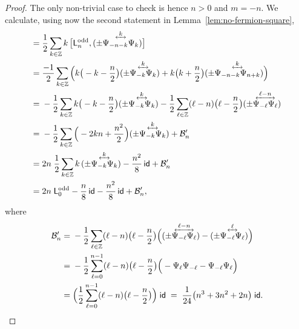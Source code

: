 \documentclass[12pt,oneside,english]{amsart}
\numberwithin{equation}{section}
\numberwithin{figure}{section}
\theoremstyle{plain}
\theoremstyle{plain}
\theoremstyle{plain}
\theoremstyle{plain}
\theoremstyle{remark}
\theoremstyle{definition}
\theoremstyle{plain}
\theoremstyle{plain}
\numberwithin{thm}{section}
\begin{document}
\begin{proof}
The only non-trivial case to check is hence $n>0$ and $m=-n$. We calculate, 
using now the second statement in Lemma~\ref{lem:no-fermion-square},
\begin{align*}
[\virL{n}^{\abbrOdd} , \virL{-n}^{\abbrOdd}]
= \; & \frac{1}{2} \sum_{k\in\Z} 
	k \, \big[ \virL{n}^{\abbrOdd} ,
		  \ourforder{\fermmode_{-n-k}}{\fermmode_{k}}{k} \big] \\
= \; & \frac{-1}{2} \sum_{k\in\Z} 
	\Big( k \big( -k-\frac{n}{2} \big)
	        \ourforder{\fermmode_{-k}}{\fermmode_{k}}{k}
	    + k \big( k+\frac{n}{2} \big)
	        \ourforder{\fermmode_{-n-k}}{\fermmode_{n+k}}{k}
	\Big) \\
= \; & -\frac{1}{2} \sum_{k\in\Z} 
	k \big( -k-\frac{n}{2} \big)
	        \ourforder{\fermmode_{-k}}{\fermmode_{k}}{k}
	- \frac{1}{2} \sum_{\ell\in\Z} 
	    (\ell - n) \big( \ell-\frac{n}{2} \big)
	        \ourforder{\fermmode_{-\ell}}{\fermmode_{\ell}}{\ell-n}  \\
= \; & -\frac{1}{2} \sum_{k\in\Z} 
	\Big( -2 k n + \frac{n^2}{2} \Big)
	        \ourforder{\fermmode_{-k}}{\fermmode_{k}}{k}
	+ \mathcal{B}'_{n} \\
= \; & 2n \; \frac{1}{2} \sum_{k\in\Z} 
		k \, \ourforder{\fermmode_{-k}}{\fermmode_{k}}{k}
	- \frac{n^2}{8} \, \id
	+ \mathcal{B}'_{n} \\
= \; & 2n \; \virL{0}^{\abbrOdd}
	- \frac{n}{8} \, \id
	- \frac{n^2}{8} \, \id
	+ \mathcal{B}'_{n} ,
\end{align*}
where 
\begin{align*}
\mathcal{B}'_{n}
= \; & - \frac{1}{2} \sum_{\ell\in\Z} 
	    (\ell - n) \big( \ell-\frac{n}{2} \big) \Big(
	        \ourforder{\fermmode_{-\ell}}{\fermmode_{\ell}}{\ell-n}
	        - \ourforder{\fermmode_{-\ell}}{\fermmode_{\ell}}{\ell} \Big) \\
= \; & - \frac{1}{2} \sum_{\ell = 0}^{n-1} 
	    (\ell - n) \big( \ell-\frac{n}{2} \big) \Big(
	        - \fermmode_{\ell}\fermmode_{-\ell}
	        - \fermmode_{-\ell}\fermmode_{\ell} \Big) \\
= \; & \Big( \frac{1}{2} \sum_{\ell = 0}^{n-1} 
	    (\ell - n) \big( \ell-\frac{n}{2} \big) \Big) \; \id
\; = \; \frac{1}{24} \big( n^3 + 3 n^2 + 2 n \big) \; \id .
\end{align*}

\end{proof}
\end{document}
